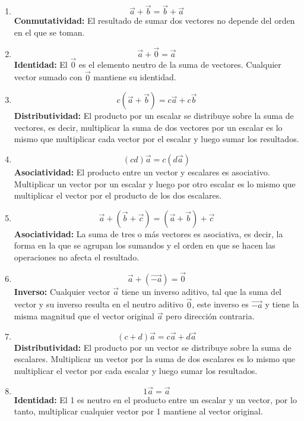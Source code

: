 \documentclass[12pt]{article}
\begin{document}
\begin{enumerate}

\item $$\vec{a}+\vec{b} = \vec{b}+\vec{a}$$
  \textbf{Conmutatividad:} El resultado de sumar dos vectores no depende del orden en el que se toman.

\item $$\vec{a}+\vec{0} = \vec{a}$$
  \textbf{Identidad:} El $\vec{0}$ es el elemento neutro de la suma de vectores. Cualquier vector sumado con $\vec{0}$ mantiene su identidad. 

\item $$c(\vec{a}+\vec{b}) = c\vec{a}+c\vec{b}$$
   \textbf{Distributividad:} El producto por un escalar se distribuye sobre la suma de vectores, es decir,  multiplicar la suma de dos vectores por un escalar es lo mismo que multiplicar cada vector por el escalar y luego sumar los resultados.

 \item $$(cd)\vec{a} = c(d\vec{a})$$
   \textbf{Asociatividad:} El producto entre un vector y escalares es asociativo. Multiplicar un vector por un escalar y luego por otro escalar es lo mismo que multiplicar el vector por el producto de los dos escalares.  

 \item $$\vec{a}+(\vec{b}+\vec{c}) = (\vec{a}+\vec{b})+\vec{c}$$
   \textbf{Asociatividad:} La suma de tres o más vectores es asociativa, es decir, la forma en la que se agrupan los sumandos  y el orden en que se hacen las operaciones no afecta el resultado.

\item $$\vec{a}+(\vec{-a}) = \vec{0}$$
  \textbf{Inverso:} Cualquier vector $\vec{a}$ tiene un inverso aditivo, tal que la suma del vector y su inverso resulta en el neutro aditivo $\vec{0}$, este inverso es $\vec{-a}$ y tiene la misma magnitud que el vector original $\vec{a}$ pero dirección contraria.
\item $$(c+d)\vec{a} = c\vec{a}+d\vec{a}$$
  \textbf{Distributividad:} El producto por un vector se distribuye sobre la suma de escalares. Multiplicar un vector por la suma de dos escalares es lo mismo que multiplicar el vector por cada escalar y luego sumar los resultados.
\item $$1\vec{a} = \vec{a}$$
  \textbf{Identidad:} El 1 es neutro en el producto entre un escalar y un vector, por lo tanto, multiplicar cualquier vector por 1 mantiene al vector original.
\end{enumerate}
\end{document}
